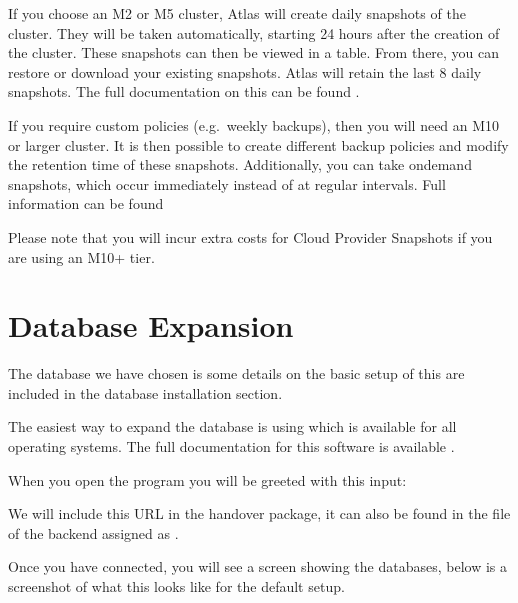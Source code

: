 \documentclass[letterpaper,10pt,english]{sphinxmanual}
\let\sphinxpxdimen\pdfpxdimen\else\newdimen\sphinxpxdimen
\begin{document}
If you choose an M2 or M5 cluster, Atlas will create daily snapshots of
the cluster. They will be taken automatically, starting 24 hours after
the creation of the cluster. These snapshots can then be viewed in a
table. From there, you can restore or download your existing snapshots.
Atlas will retain the last 8 daily snapshots. The full documentation on
this can be found
.

If you require custom policies (e.g. weekly backups), then you will need
an M10 or larger cluster. It is then possible to create different backup
policies and modify the retention time of these snapshots. Additionally,
you can take on\sphinxhyphen{}demand snapshots, which occur immediately instead of at
regular intervals. Full information can be found

Please note that you will incur extra costs for Cloud Provider Snapshots
if you are using an M10+ tier.


\section{Database Expansion}
\label{\detokenize{docs/Expansion/database-expansion:database-expansion}}\label{\detokenize{docs/Expansion/database-expansion::doc}}
The database we have chosen is 
some details on the basic setup of this are included in the database
installation section.

The easiest way to expand the database is using  which is available
for all operating systems. The full documentation for this software is
available .

When you open the program you will be greeted with this input:

\noindent\sphinxincludegraphics[width=300\sphinxpxdimen]{{connect}.png}

We will include this URL in the handover package, it can also be found
in the  file of the backend assigned as .

Once you have connected, you will see a screen showing the databases,
below is a screenshot of what this looks like for the default setup.
\end{document}
